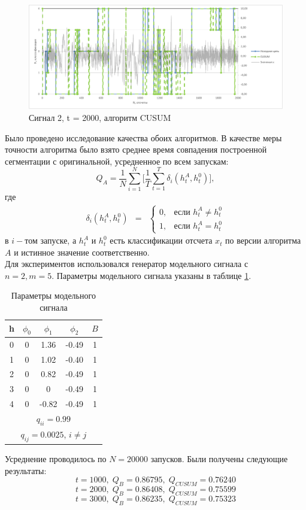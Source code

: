 \documentclass[12pt,a4paper]{article}
\begin{document}
\begin{figure}[h]
\includegraphics[width=\linewidth]{2k_cusum}
\caption{Сигнал 2, t = 2000, алгоритм CUSUM}
\label{signal_2_cusum}
\end{figure}

Было проведено исследование качества обоих алгоритмов. В качестве меры точности алгоритма было взято среднее время совпадения построенной сегментации с оригинальной, усредненное по всем запускам:
$$Q_A = \frac{1}{N}\sum_{i=1}^{N}\bigg[\frac{1}{T}\sum_{t=1}^{T}\delta_i(h_t^A,h_t^0)\bigg],$$
где
$$\begin{matrix}
\delta_i(h_t^A,h_t^0) & = & \left\{
\begin{matrix}
0, & \mbox{если } h_t^A \neq h_t^0 \\
1, & \mbox{если } h_t^A = h_t^0 
\end{matrix}\right.
\end{matrix}
$$
в $i-$том запуске, а $h_t^A \mbox{ и } h_t^0$ есть классификации отсчета $x_t$ по версии алгоритма $A$ и истинное значение соответственно.\\
Для экспериментов использовался генератор модельного сигнала с \\$n = 2, m = 5$. Параметры модельного сигнала указаны в таблице \ref{signal_param}.
\\

\begin{table}[h]
\caption{Параметры модельного сигнала}
\label{signal_param}
\begin{center}
\begin{tabular}{|c|c|c|c|c|}
\hline
h & $\phi_0$ & $\phi_1$ & $\phi_2$ & $B$\\
\hline
0 & 0 & 1.36 & -0.49 & 1\\
\hline
1 & 0 & 1.02 & -0.40 & 1\\
\hline
2 & 0 & 0.82 & -0.49 & 1\\
\hline
3 & 0 & 0 & -0.49 & 1\\
\hline
4 & 0 & -0.82 & -0.49 & 1\\
\hline
\multicolumn{5}{|c|}{$q_{ii} = 0.99$}\\
\hline
\multicolumn{5}{|c|}{$q_{ij} = 0.0025$, $i \neq j$}\\
\hline
\end{tabular}
\end{center}
\end{table}
Усреднение проводилось по $N = 20000$ запусков. Были получены следующие результаты:
$$t = 1000,\; Q_B = 0.86795,\; Q_{CUSUM} = 0.76240$$
$$t = 2000,\; Q_B = 0.86408,\; Q_{CUSUM} = 0.75599$$
$$t = 3000,\; Q_B = 0.86235,\; Q_{CUSUM} = 0.75323$$
\end{document}
